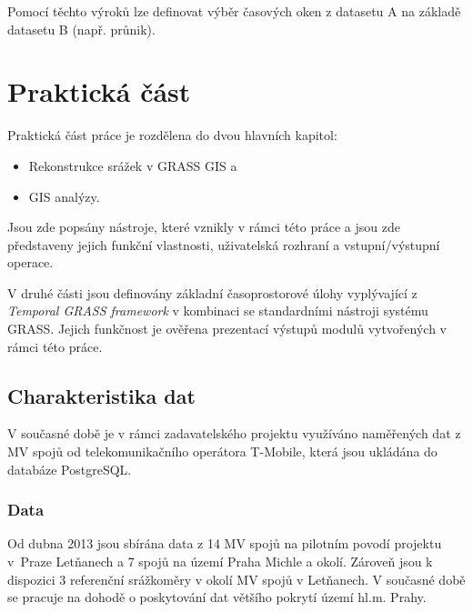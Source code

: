 \documentclass[a4paper,12pt,oneside]{report}
\begin{document}
Pomocí těchto výroků lze definovat výběr časových oken z datasetu A
na základě datasetu B (např. průnik).













\newpage
\setcounter{footnote}{1}
\chapter*{Praktická část}
\setcounter{section}{3}

\noindent Praktická část práce je rozdělena do dvou hlavních kapitol:

\begin{itemize}
\item Rekonstrukce srážek v GRASS GIS a
\item GIS analýzy.
\end{itemize}


Jsou zde popsány nástroje, které vznikly v rámci této
práce a jsou zde předst\-aveny jejich funkční vlastnosti, uživatelská
rozhraní a vstupní/výstupní operace.

V druhé části jsou definovány základní časoprostorové úlohy
vyplývající z \textit{Temporal GRASS framework} v kombinaci se
standardními nástroji systému GRASS. Jejich funkčnost je ověřena
prezentací výstupů modulů vytvořených v rámci této práce.

\setcounter{footnote}{1}
\section{Charakteristika dat}

V současné době je v rámci zadavatelského projektu  využíváno naměřených dat z
MV spojů od telekomunikačního operátora T-Mobile, která jsou ukládána
do databáze PostgreSQL.

\subsection*{Data}  
 
Od dubna 2013 jsou sbírána data z 14 MV spojů na pilotním povodí
projektu v~Praze Letňanech a 7 spojů na území Praha Michle a
okolí. Zároveň jsou k dispozici 3 referenční srážkoměry v okolí MV
spojů v Letňanech.  V současné době se pracuje na dohodě o poskytování
dat většího pokrytí území hl.m. Prahy.
\end{document}
